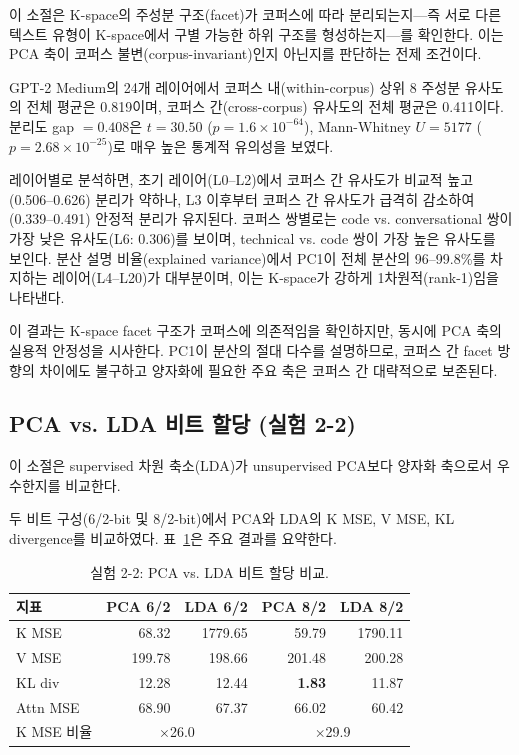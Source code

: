 \documentclass[11pt,a4paper]{article}
\begin{document}
이 소절은 K-space의 주성분 구조(facet)가 코퍼스에 따라 분리되는지---즉 서로 다른 텍스트 유형이 K-space에서 구별 가능한 하위 구조를 형성하는지---를 확인한다. 이는 PCA 축이 코퍼스 불변(corpus-invariant)인지 아닌지를 판단하는 전제 조건이다.

GPT-2 Medium의 24개 레이어에서 코퍼스 내(within-corpus) 상위 8 주성분 유사도의 전체 평균은 0.819이며, 코퍼스 간(cross-corpus) 유사도의 전체 평균은 0.411이다. 분리도 gap $= 0.408$은 $t = 30.50$ ($p = 1.6 \times 10^{-64}$), Mann-Whitney $U = 5177$ ($p = 2.68 \times 10^{-25}$)로 매우 높은 통계적 유의성을 보였다.

레이어별로 분석하면, 초기 레이어(L0--L2)에서 코퍼스 간 유사도가 비교적 높고(0.506--0.626) 분리가 약하나, L3 이후부터 코퍼스 간 유사도가 급격히 감소하여(0.339--0.491) 안정적 분리가 유지된다. 코퍼스 쌍별로는 code vs. conversational 쌍이 가장 낮은 유사도(L6: 0.306)를 보이며, technical vs. code 쌍이 가장 높은 유사도를 보인다. 분산 설명 비율(explained variance)에서 PC1이 전체 분산의 96--99.8\%를 차지하는 레이어(L4--L20)가 대부분이며, 이는 K-space가 강하게 1차원적(rank-1)임을 나타낸다.

이 결과는 K-space facet 구조가 코퍼스에 의존적임을 확인하지만, 동시에 PCA 축의 실용적 안정성을 시사한다. PC1이 분산의 절대 다수를 설명하므로, 코퍼스 간 facet 방향의 차이에도 불구하고 양자화에 필요한 주요 축은 코퍼스 간 대략적으로 보존된다.

\subsection{PCA vs. LDA 비트 할당 (실험 2-2)}

이 소절은 supervised 차원 축소(LDA)가 unsupervised PCA보다 양자화 축으로서 우수한지를 비교한다.

두 비트 구성(6/2-bit 및 8/2-bit)에서 PCA와 LDA의 K MSE, V MSE, KL divergence를 비교하였다. 표~\ref{tab:exp22}은 주요 결과를 요약한다.

\begin{table}[H]
\centering
\caption{실험 2-2: PCA vs. LDA 비트 할당 비교.}
\label{tab:exp22}
\small
\begin{tabular}{lrrrr}
\toprule
\textbf{지표} & \textbf{PCA 6/2} & \textbf{LDA 6/2} & \textbf{PCA 8/2} & \textbf{LDA 8/2} \\
\midrule
K MSE & 68.32 & 1779.65 & 59.79 & 1790.11 \\
V MSE & 199.78 & 198.66 & 201.48 & 200.28 \\
KL div & 12.28 & 12.44 & \textbf{1.83} & 11.87 \\
Attn MSE & 68.90 & 67.37 & 66.02 & 60.42 \\
\midrule
K MSE 비율 & \multicolumn{2}{c}{$\times$26.0} & \multicolumn{2}{c}{$\times$29.9} \\
\bottomrule
\end{tabular}
\end{table}
\end{document}
